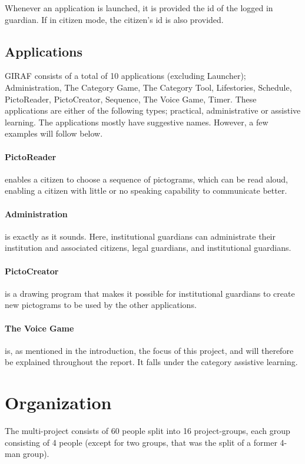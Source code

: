 Whenever an application is launched, it is provided the id of the logged in guardian.
If in citizen mode, the citizen's id is also provided.

\subsection{Applications}
GIRAF consists of a total of 10 applications (excluding Launcher); Administration, The Category Game, The Category Tool, Lifestories, Schedule, PictoReader, PictoCreator, Sequence, The Voice Game, Timer.
These applications are either of the following types; practical, administrative or assistive learning.
The applications mostly have suggestive names.
However, a few examples will follow below.

\paragraph{PictoReader} enables a citizen to choose a sequence of pictograms, which can be read aloud, enabling a citizen with little or no speaking capability to communicate better.

\paragraph{Administration} is exactly as it sounds.
Here, institutional guardians can administrate their institution and associated citizens, legal guardians, and institutional guardians.

\paragraph{PictoCreator} is a drawing program that makes it possible for institutional guardians to create new pictograms to be used by the other applications.

\paragraph{The Voice Game} is, as mentioned in the introduction, the focus of this project, and will therefore be explained throughout the report.
It falls under the category assistive learning.

\section{Organization}
The multi-project consists of 60 people split into 16 project-groups, each group consisting of 4 people (except for two groups, that was the split of a former 4-man group).

